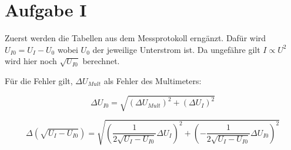 \setcounter{equation}{8}
\section{Aufgabe I}

Zuerst werden die Tabellen aus dem Messprotokoll erngänzt. Dafür wird
$U_{I0} = U_I - U_0$ wobei $U_0$ der jeweilige Unterstrom ist.  Da ungefähre gilt
$I \propto U^2$ wird hier noch $\sqrt{U_{I0}}$ berechnet.

Für die Fehler gilt, $\Delta U_{Mult}$ als Fehler des Multimeters:

\begin{equation}
    \Delta U_{I0} = \sqrt{(\Delta U_{Mult})^2 + (\Delta U_I)^2} 
\end{equation}

\begin{equation}
    \Delta \left(\sqrt{U_I  - U_{I0}}\right) = \sqrt{\left(\frac{1}{2\sqrt{U_I - U_{I0}}} \Delta U_I\right)^2 + \left(-\frac{1}{2\sqrt{U_I - U_{I0}}} \Delta U_{I0}\right)^2}
\end{equation}
\bigskip
\bigskip
